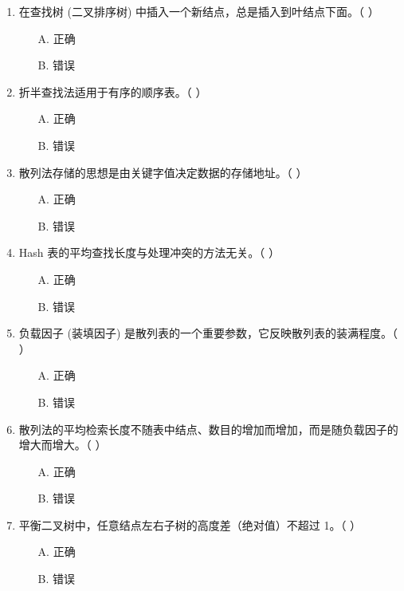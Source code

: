 \documentclass[12pt, a4paper]{article}
\begin{document}
\begin{enumerate}[label=\arabic*.]
	\item 在查找树 (二叉排序树) 中插入一个新结点，总是插入到叶结点下面。（ ）
	      \begin{enumerate}
		      \item[A.] 正确
		      \item[B.] 错误
	      \end{enumerate}

	\item 折半查找法适用于有序的顺序表。（ ）
	      \begin{enumerate}
		      \item[A.] 正确
		      \item[B.] 错误
	      \end{enumerate}

	\item 散列法存储的思想是由关键字值决定数据的存储地址。（ ）
	      \begin{enumerate}
		      \item[A.] 正确
		      \item[B.] 错误
	      \end{enumerate}

	\item Hash 表的平均查找长度与处理冲突的方法无关。（ ）
	      \begin{enumerate}
		      \item[A.] 正确
		      \item[B.] 错误
	      \end{enumerate}

	\item 负载因子 (装填因子) 是散列表的一个重要参数，它反映散列表的装满程度。（ ）
	      \begin{enumerate}
		      \item[A.] 正确
		      \item[B.] 错误
	      \end{enumerate}

	\item 散列法的平均检索长度不随表中结点、数目的增加而增加，而是随负载因子的增大而增大。（ ）
	      \begin{enumerate}
		      \item[A.] 正确
		      \item[B.] 错误
	      \end{enumerate}

	\item 平衡二叉树中，任意结点左右子树的高度差（绝对值）不超过 1。（ ）
	      \begin{enumerate}
		      \item[A.] 正确
		      \item[B.] 错误
	      \end{enumerate}


\end{enumerate}
\end{document}
